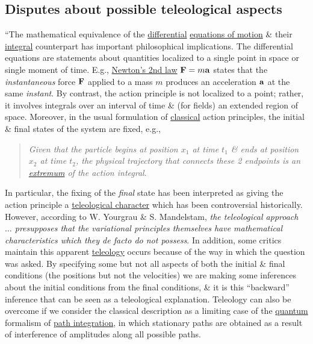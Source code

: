 \documentclass[oneside]{book}
\numberwithin{equation}{section}
\begin{document}
\subsection{Disputes about possible teleological aspects}
``The mathematical equivalence of the \href{https://en.wikipedia.org/wiki/Differential_equation}{differential} \href{https://en.wikipedia.org/wiki/Equations_of_motion}{equations of motion} \& their \href{https://en.wikipedia.org/wiki/Integral_equation}{integral} counterpart has important philosophical implications. The differential equations are statements about quantities localized to a single point in space or single moment of time. E.g., \href{https://en.wikipedia.org/wiki/Newton%27s_laws_of_motion}{Newton's 2nd law} ${\bf F} = m{\bf a}$ states that the \textit{instantaneous} force ${\bf F}$ applied to a mass $m$ produces an acceleration ${\bf a}$ at the same \textit{instant}. By contrast, the action principle is not localized to a point; rather, it involves integrals over an interval of time \& (for fields) an extended region of space. Moreover, in the usual formulation of \href{https://en.wikipedia.org/wiki/Classical_physics}{classical} action principles, the initial \& final states of the system are fixed, e.g.,
\begin{quotation}
	\textit{Given that the particle begins at position $x_1$ at time $t_1$ \& ends at position $x_2$ at time $t_2$, the physical trajectory that connects these 2 endpoints is an \href{https://en.wikipedia.org/wiki/Extremum}{extremum} of the action integral}.
\end{quotation}
In particular, the fixing of the \textit{final} state has been interpreted as giving the action principle a \href{https://en.wikipedia.org/wiki/Teleology}{teleological character} which has been controversial historically. However, according to W. Yourgrau \& S. Mandelstam, \textit{the teleological approach $\ldots$ presupposes that the variational principles themselves have mathematical characteristics which they \emph{de facto} do not possess}. In addition, some critics maintain this apparent \href{https://en.wikipedia.org/wiki/Teleology}{teleology} occurs because of the way in which the question was asked. By specifying some but not all aspects of both the initial \& final conditions (the positions but not the velocities) we are making some inferences about the initial conditions from the final conditions, \& it is this ``backward'' inference that can be seen as a teleological explanation. Teleology can also be overcome if we consider the classical description as a limiting case of the \href{https://en.wikipedia.org/wiki/Quantum_mechanics}{quantum} formalism of \href{https://en.wikipedia.org/wiki/Path_integral_formulation}{path integration}, in which stationary paths are obtained as a result of interference of amplitudes along all possible paths.
\end{document}
